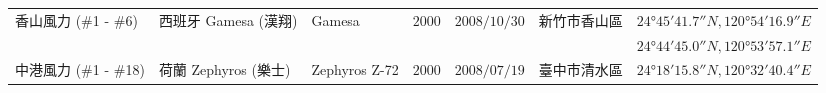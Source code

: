 \begin{landscape}
\begin{table}[htp]
\begin{tabular}{lllrlll}
      香山風力 (\#1 - \#6)      & 西班牙 Gamesa (漢翔)        & Gamesa            & $2000$            & $2008/10/30$        & 新竹市香山區  & $24°45'41.7″N, 120°54'16.9″E$ \\
                                &                             &                   &                   &                     &               & $24°44'45.0″N, 120°53'57.1″E$ \\
      中港風力 (\#1 - \#18)     & 荷蘭 Zephyros (樂士)        & Zephyros Z-72     & $2000$            & $2008/07/19$        & 臺中市清水區  & $24°18'15.8″N, 120°32'40.4″E$ \\
      \bottomrule
    \end{tabular}
    \label{table: Taiwan Wind Farm Data}
  \end{table}
\end{landscape}

\newpage

